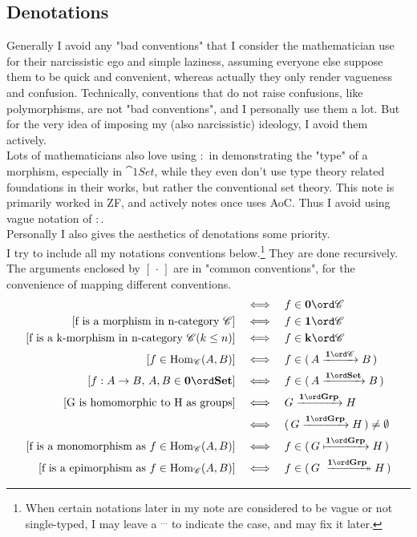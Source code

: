 \subsection{Denotations}

Generally I avoid any "bad conventions" that I consider the mathematician use for their narcissistic ego and simple laziness, assuming everyone else suppose them to be quick and convenient, whereas actually they only render vagueness and confusion. Technically, conventions that do not raise confusions, like polymorphisms, are not "bad conventions", and I personally use them a lot. But for the very idea of imposing my (also narcissistic) ideology, I avoid them actively.\\

Lots of mathematicians also love using \(:\) in demonstrating the "type" of a morphism, especially in \(\cat{1}{Set}\), while they even don't use type theory related foundations in their works, but rather the conventional set theory. This note is primarily worked in ZF, and actively notes once uses AoC. Thus I avoid using vague notation of \(:\). \\

Personally I also gives the aesthetics of denotations some priority.\\

I try to include all my notations conventions below.\footnote[1]{When certain notations later in my note are considered to be vague or not single-typed, I may leave a \(^{\ldots}\) to indicate the case, and may fix it later.} They are done recursively. The arguments enclosed by \([\,\cdot\,]\) are in "common conventions", for the convenience of mapping different conventions. \\

\begin{align}
  [\text{f is an object in n-category }\cc] &\corres f\in \cat{0}{\cc} \\
  [\text{f is a morphism in n-category }\cc] &\corres f\in \cat{1}{\cc} \\
  [\text{f is a k-morphism in n-category }\cc (k\leq n)] &\corres f\in \cat{k}{\cc} \\
  [f\in \operatorname{Hom}_{\cc}(A,B)] &\corres f\in \col{A \morp{\cc} B} \\
  [f: A\to B,\, {A, B}\in \cat{0}{Set}] &\corres f\in \col{A \func B} \\
  [\text{G is homomorphic to H as groups}] &\corres G\morp{Grp} H \\
                                            &\corres \col{G\morp{Grp} H} \neq \emptyset \\
  [\text{f is a monomorphism as } f\in \operatorname{Hom}_{\cc}(A,B)] &\corres f\in \col{G\mono{Grp} H} \\
  [\text{f is a epimorphism as } f\in \operatorname{Hom}_{\cc}(A,B)] &\corres f\in \col{G\epi{Grp} H}
\end{align}

